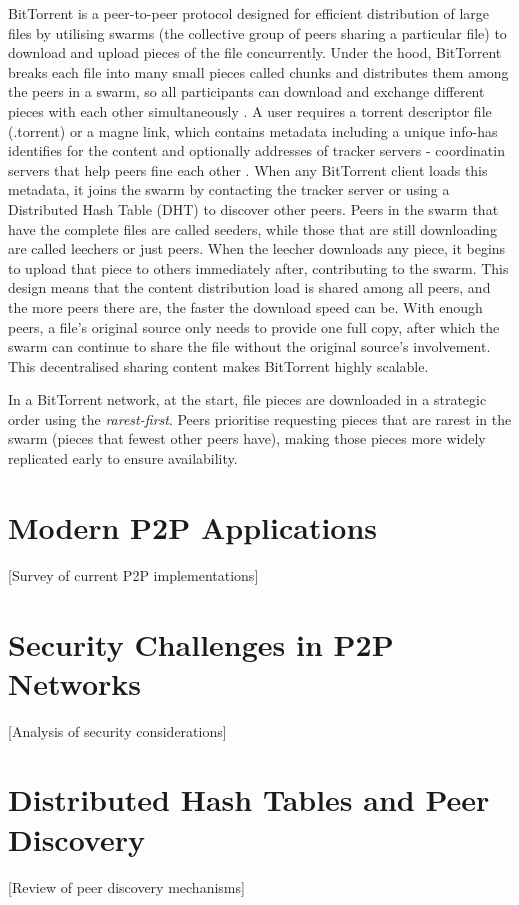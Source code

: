 \documentclass[12pt,a4paper]{report}
\begin{document}
BitTorrent is a peer-to-peer protocol designed for efficient distribution of large files by utilising swarms (the collective group of peers sharing a particular file) to download and upload pieces of the file concurrently. Under the hood, BitTorrent breaks each file into many small pieces called chunks and distributes them among the peers in a swarm, so all participants can download and exchange different pieces with each other simultaneously \cite{BitTorrent-spec}. A user requires a torrent descriptor file (.torrent) or a magne link, which contains metadata including a unique info-has identifies for the content and optionally addresses of tracker servers - coordinatin servers that help peers fine each other \cite{BitTorrent-spec}. When any BitTorrent client loads this metadata, it joins the swarm by contacting the tracker server or using a Distributed Hash Table (DHT) to discover other peers. Peers in the swarm that have the complete files are called seeders, while those that are still downloading are called leechers or just peers. When the leecher downloads any piece, it begins to upload that piece to others immediately after, contributing to the swarm. This design means that the content distribution load is shared among all peers, and the more peers there are, the faster the download speed can be. With enough peers, a file's original source only needs to provide one full copy, after which the swarm can continue to share the file without the original source's involvement. This decentralised sharing content makes BitTorrent highly scalable.

In a BitTorrent network, at the start, file pieces are downloaded in a strategic order using the \textit{rarest-first}. Peers prioritise requesting pieces that are rarest in the swarm (pieces that fewest other peers have), making those pieces more widely replicated early to ensure availability.

\section{Modern P2P Applications}
 [Survey of current P2P implementations]

\section{Security Challenges in P2P Networks}
 [Analysis of security considerations]

\section{Distributed Hash Tables and Peer Discovery}
 [Review of peer discovery mechanisms]
\end{document}
